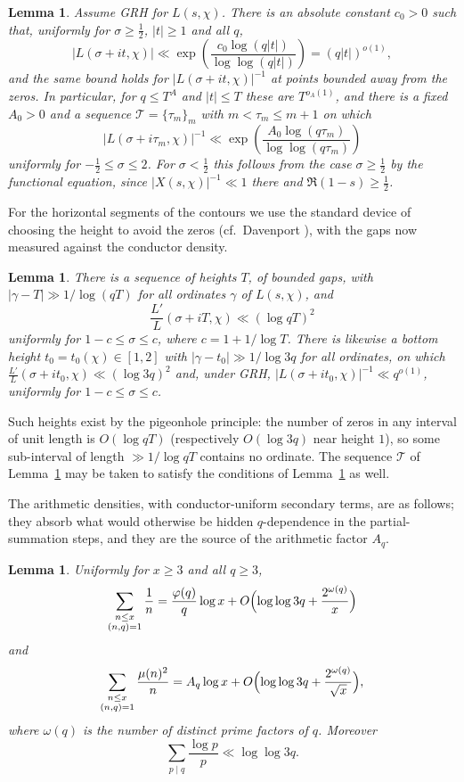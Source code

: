 \documentclass[10pt,a4paper]{amsart}
\newtheorem{lemma}[theorem]{Lemma}
\numberwithin{equation}{section}
\begin{document}
\begin{lemma}\label{lem:GRHsize}
Assume GRH for $L(s,\chi)$. There is an absolute constant $c_0>0$ such that, uniformly for $\sigma\ge\tfrac12$, $|t|\ge1$ and all $q$,
\[
|L(\sigma+it,\chi)|\ll\exp\!\left(\frac{c_0\log(q|t|)}{\log\log(q|t|)}\right)=(q|t|)^{o(1)} ,
\]
and the same bound holds for $|L(\sigma+it,\chi)|^{-1}$ at points bounded away from the zeros. In particular, for $q\le T^{A}$ and $|t|\le T$ these are $T^{o_A(1)}$, and there is a fixed $A_0>0$ and a sequence $\mathcal T=\{\tau_m\}_{m}$ with $m<\tau_m\le m+1$ on which
\[
|L(\sigma+i\tau_m,\chi)|^{-1}\ll\exp\!\left(\frac{A_0\log(q\tau_m)}{\log\log(q\tau_m)}\right)
\]
uniformly for $-\tfrac12\le\sigma\le 2$. For $\sigma<\tfrac12$ this follows from the case $\sigma\ge\tfrac12$ by the functional equation, since $|X(s,\chi)|^{-1}\ll1$ there and $\Re(1-s)\ge\tfrac12$.
\end{lemma}

For the horizontal segments of the contours we use the standard device of choosing the height to avoid the zeros (cf.\ Davenport \cite[p.~108]{Davenport}), with the gaps now measured against the conductor density.

\begin{lemma}\label{lem:heights}
There is a sequence of heights $T$, of bounded gaps, with $|\gamma-T|\gg1/\log(qT)$ for all ordinates $\gamma$ of $L(s,\chi)$, and
\[
\frac{L'}{L}(\sigma+iT,\chi)\ll(\log qT)^2
\]
uniformly for $1-c\le\sigma\le c$, where $c=1+1/\log T$. There is likewise a bottom height $t_0=t_0(\chi)\in[1,2]$ with $|\gamma-t_0|\gg1/\log 3q$ for all ordinates, on which $\frac{L'}{L}(\sigma+it_0,\chi)\ll(\log 3q)^2$ and, under GRH, $|L(\sigma+it_0,\chi)|^{-1}\ll q^{o(1)}$, uniformly for $1-c\le\sigma\le c$.
\end{lemma}

Such heights exist by the pigeonhole principle: the number of zeros in any interval of unit length is $O(\log qT)$ (respectively $O(\log 3q)$ near height $1$), so some sub-interval of length $\gg1/\log qT$ contains no ordinate. The sequence $\mathcal T$ of Lemma~\ref{lem:GRHsize} may be taken to satisfy the conditions of Lemma~\ref{lem:heights} as well.

The arithmetic densities, with conductor-uniform secondary terms, are as follows; they absorb what would otherwise be hidden $q$-dependence in the partial-summation steps, and they are the source of the arithmetic factor $A_q$.

\begin{lemma}\label{lem:densities}
Uniformly for $x\ge3$ and all $q\ge3$,
\[
\sum_{\substack{n\le x\\(n,q)=1}}\frac1n=\frac{\varphi(q)}{q}\log x+O\Bigl(\log\log 3q+\frac{2^{\omega(q)}}{x}\Bigr)
\]
and
\[
\sum_{\substack{n\le x\\(n,q)=1}}\frac{\mu(n)^2}{n}=A_q\log x+O\Bigl(\log\log 3q+\frac{2^{\omega(q)}}{\sqrt x}\Bigr),
\]
where $\omega(q)$ is the number of distinct prime factors of $q$. Moreover
\[
\sum_{p\mid q}\frac{\log p}{p}\ll\log\log 3q .
\]
\end{lemma}
\end{document}
